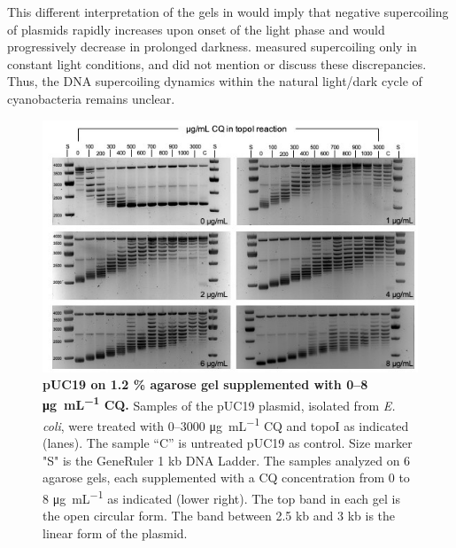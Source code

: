 \documentclass[10pt,a4]{article}
\newcommand{\ugml}{\micro\gram\per\milli\liter}
\begin{document}
This different interpretation of the gels in \citet{Woelfle2007} would
imply that negative supercoiling of plasmids rapidly increases upon
onset of the light phase and would progressively decrease in prolonged
darkness.  \citet{Vijayan2009} measured supercoiling only in constant
light conditions, and did not mention or discuss these discrepancies.
Thus, the DNA supercoiling dynamics within the natural light/dark
cycle of cyanobacteria remains unclear.

\begin{figure}[ht!]
    \includegraphics[width=\textwidth]{figures/keller_puc19.jpg}
  \caption{\textbf{pUC19 on 1.2 \% agarose gel supplemented with 0--8
      \si{\ugml} CQ.} Samples of the pUC19 plasmid, isolated from
    \textit{E. coli}, were treated with 0--3000 \si{\ugml} CQ and
    topoI as indicated (lanes). The sample “C” is untreated pUC19 as
    control. Size marker "S" is the GeneRuler 1 kb DNA Ladder. The
    samples analyzed on 6 agarose gels, each supplemented with a CQ
    concentration from 0 to 8 \si{\ugml} as indicated (lower
    right). The top band in each gel is the open circular form. The
    band between 2.5 kb and 3 kb is the linear form of the plasmid.}
  \label{fig:keller} 
\end{figure}
\end{document}
